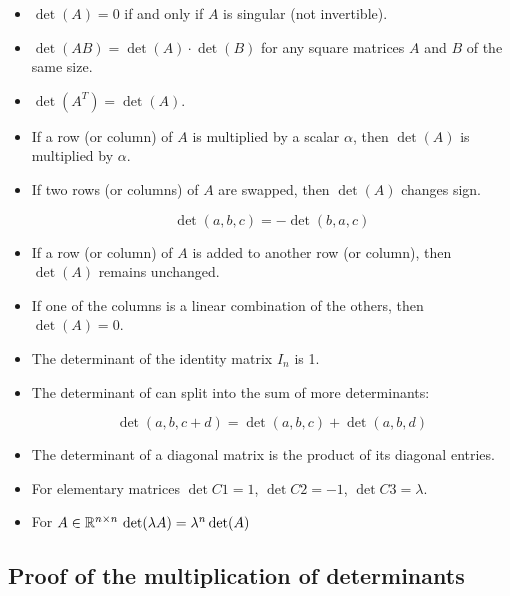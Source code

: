 \begin{itemize}
    
    \item \(\det(A) = 0\) if and only if \(A\) is singular (not invertible).
    
    \item \(\det(AB) = \det(A) \cdot \det(B)\) for any square matrices \(A\) and \(B\) of the same size.
    
    \item \(\det(A^T) = \det(A)\).
    
    \item If a row (or column) of \(A\) is multiplied by a scalar \(\alpha\),     
    then \(\det(A)\) is multiplied by \(\alpha\).
    
    \item If two rows (or columns) of \(A\) are swapped, then \(\det(A)\) changes sign.
    
    \[
        \det(a,b,c) = - \det(b,a,c)
    \]
    
    \item If a row (or column) of \(A\) is added to another row (or column), then \(\det(A)\) remains unchanged.

    \item If one of the columns is a linear combination of the others, then \(\det(A) = 0\).
    
    \item The determinant of the identity matrix \(I_n\) is 1.
    
    \item The determinant of can split into the sum of more determinants:

    \[
        \det(a,b,c + d) = \det(a,b,c) + \det(a,b,d)
    \]
    
    \item The determinant of a diagonal matrix is the product of its diagonal entries.
    
    \item For elementary matrices \(\det C1 = 1\), \(\det C2 = -1\), \(\det C3 = \lambda\).
    
    \item For \(A \in \mathbb{R}^{n\times n}\, \det(\lambda A) = \lambda^n \det(A)\) 

\end{itemize}

\subsection{Proof of the multiplication of determinants}

